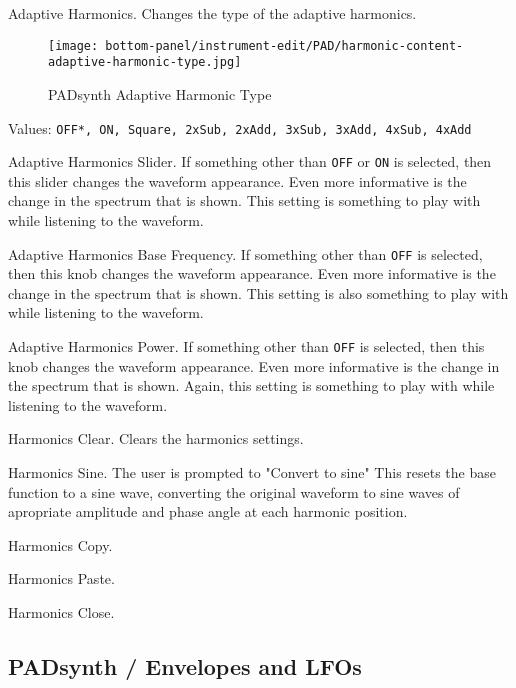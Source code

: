    Adaptive Harmonics.
   Changes the type of the adaptive harmonics.

\begin{figure}[H]
   \centering
   \texttt{[image: bottom-panel/instrument-edit/PAD/harmonic-content-adaptive-harmonic-type.jpg]}
   \caption{PADsynth Adaptive Harmonic Type}
   \label{fig:padsynth_adaptive_harmonic_type}
\end{figure}

   Values: \texttt{OFF*, ON, Square, 2xSub, 2xAdd, 3xSub, 3xAdd, 4xSub, 4xAdd}

   Adaptive Harmonics Slider.
   If something other than \texttt{OFF} or \texttt{ON} is selected,
   then this slider changes the waveform appearance.
   Even more informative is the change in the spectrum that is shown.
   This setting is something to play with while listening to the
   waveform.

   Adaptive Harmonics Base Frequency.
   If something other than \texttt{OFF} is selected,
   then this knob changes the waveform appearance.
   Even more informative is the change in the spectrum that is shown.
   This setting is also something to play with while listening to the
   waveform.

   Adaptive Harmonics Power.
   If something other than \texttt{OFF} is selected,
   then this knob changes the waveform appearance.
   Even more informative is the change in the spectrum that is shown.
   Again, this setting is something to play with while listening to the
   waveform.

   Harmonics Clear.
   Clears the harmonics settings.

   Harmonics Sine.
   The user is prompted to "Convert to sine"
   This resets the base function to a sine wave, converting the
   original waveform to sine waves of apropriate amplitude and phase
   angle at each harmonic position.

   Harmonics Copy.

   Harmonics Paste.

   Harmonics Close.

\subsection{PADsynth / Envelopes and LFOs}
\label{subsec:padsynth_envelopes_lfos}

